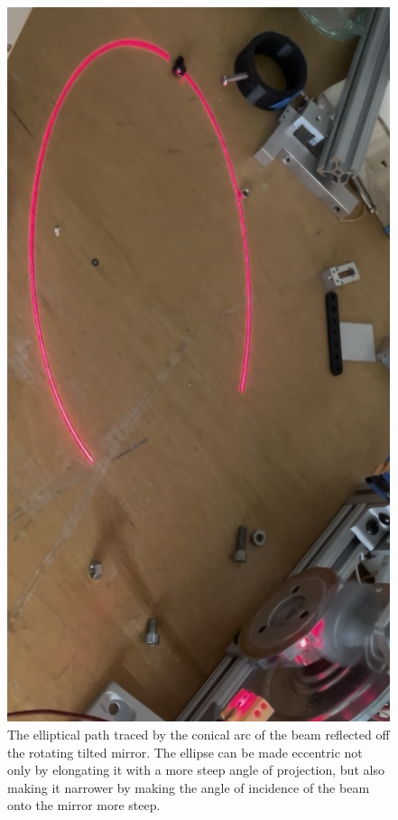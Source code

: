 \documentclass[twocolumn]{revtex4-2}
\begin{document}
\begin{figure}
    \centering
    \includegraphics[width=0.95\linewidth]{ellipse-trace.png}
    \caption[Elliptical Path from Tilted Mirror]{The elliptical path traced by the conical arc of the beam reflected off the rotating tilted mirror. The ellipse can be made eccentric not only by elongating it with a more steep angle of projection, but also making it narrower by making the angle of incidence of the beam onto the mirror more steep. }
    \label{fig:ellipse-trace}
\end{figure}
\end{document}

